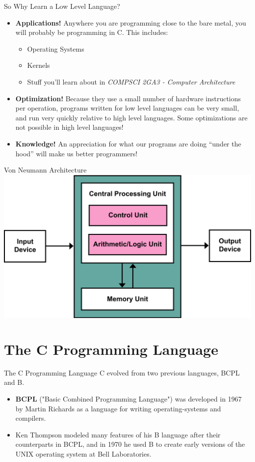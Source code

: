 \documentclass[11pt]{beamer}
\begin{document}
\begin{frame}{So Why Learn a Low Level Language?}
\begin{itemize}
\item \textbf{Applications!} Anywhere you are programming close to the bare metal, you will probably be programming in C.  This includes:
\begin{itemize}
\item Operating Systems 
\item Kernels
\item Stuff you'll learn about in \emph{COMPSCI 2GA3 - Computer Architecture}
\end{itemize}
\item \textbf{Optimization!} Because they use a small number of hardware instructions per operation, programs written for low level languages can be very small, and run very quickly relative to high level languages.  Some optimizations are not possible in high level languages! 
\item \textbf{Knowledge!}  An appreciation for what our programs are doing ``under the hood'' will make us better programmers!  
\end{itemize}
\end{frame}

\begin{frame}{Von Neumann Architecture}
\center
\includegraphics[scale=0.2]{VonNeumann.png}
\end{frame}

\section[C]{The C Programming Language}
\begin{frame}{The C Programming Language}
C evolved from two previous languages, BCPL and B.
\begin{itemize}
\item \textbf{BCPL} ("Basic Combined Programming Language") was developed in 1967 by Martin Richards as a language for writing operating-systems and compilers.
\item Ken Thompson modeled many features of his B language after their counterparts in BCPL, and in 1970 he used B to create early versions of the UNIX operating system at Bell Laboratories.
\end{itemize}
\end{frame}
\end{document}
